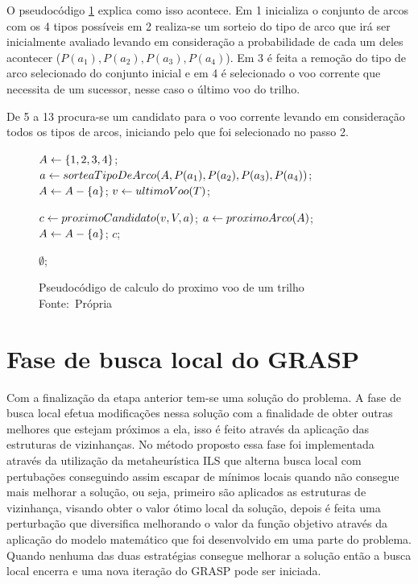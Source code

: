 O pseudocódigo \ref{alg:calcvoo} explica como isso acontece. Em 1 inicializa o
conjunto de arcos com os 4 tipos possíveis em 2 realiza-se um sorteio do tipo de
arco que irá ser inicialmente avaliado levando em consideração a probabilidade
de cada um deles acontecer ($P(a_{1}), P(a_{2}), P(a_{3}), P(a_{4})$). Em 3 é
feita a remoção do tipo de arco selecionado do conjunto inicial e em 4
é selecionado o voo corrente que necessita de um sucessor, nesse caso o último
voo do trilho.

De 5 a 13 procura-se um candidato para o voo corrente levando em consideração
todos os tipos de arcos, iniciando pelo que foi selecionado no passo 2.

\begin{figure}[h]
\caption{Pseudocódigo de calculo do proximo voo de um trilho
\newline
\mbox{Fonte: Própria}}\label{alg:calcvoo}
\begin{programma}

\STATE $A \leftarrow \{1,2,3,4\}$;
\STATE $a \leftarrow sorteaTipoDeArco(A, P(a_{1}),P(a_{2}),P(a_{3}),P(a_{4}))$;
\STATE $A \leftarrow A - \{a\}$; \STATE $v \leftarrow ultimoVoo(T)$;

\STATE $c \leftarrow proximoCandidato(v, V, a)$;
	\STATE $a \leftarrow proximoArco(A)$;
	\STATE $A \leftarrow A - \{a\}$;
\ELSE
	\STATE\RETURN $c$;
\ENDIF 
\ENDFOR

\STATE\RETURN $\emptyset$;

\ENDALGORITHM
\end{programma}
\end{figure}
 
 \section{Fase de busca local do GRASP}

Com a finalização da etapa anterior tem-se uma solução do problema. A fase de busca
local efetua modificações nessa solução com a finalidade de obter outras
melhores que estejam próximos a ela, isso é feito através da aplicação das
estruturas de vizinhanças. No método proposto essa fase foi implementada através
da utilização da metaheurística ILS que alterna busca local com pertubações
conseguindo assim escapar de mínimos locais quando não consegue mais melhorar a
solução, ou seja, primeiro são aplicados as estruturas de vizinhança, visando
obter o valor ótimo local da solução, depois é feita uma perturbação que
diversifica melhorando o valor da função objetivo através da aplicação do
modelo matemático que foi desenvolvido em uma parte do problema. Quando nenhuma
das duas estratégias consegue melhorar a solução então a busca local encerra e
uma nova iteração do GRASP pode ser iniciada.
 

